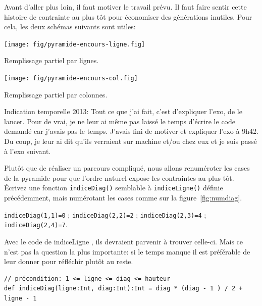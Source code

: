 \documentclass[10pt]{article}\usepackage[nu]{esial}
\begin{document}
\begin{Reponse}
  Avant d'aller plus loin, il faut motiver le travail prévu. Il faut faire
  sentir cette histoire de contrainte au plus tôt pour économiser des
  générations inutiles. Pour cela, les deux schémas suivants sont utiles:
  
  \begin{minipage}{.4\linewidth}
    \centering
    \texttt{[image: fig/pyramide-encours-ligne.fig]}\vspace{-.5\baselineskip}
    
    Remplissage partiel par lignes.
  \end{minipage}\hfill
  \begin{minipage}{.4\linewidth} 
    \centering
    \texttt{[image: fig/pyramide-encours-col.fig]}\vspace{-.5\baselineskip}
    
    Remplissage partiel par colonnes.
  \end{minipage}

  Indication temporelle 2013: Tout ce que j'ai fait, c'est d'expliquer l'exo, de
  le lancer. Pour de vrai, je ne leur ai même pas laissé le temps d'écrire le
  code demandé car j'avais pas le temps. J'avais fini de motiver et expliquer
  l'exo à 9h42. Du coup, je leur ai dit qu'ils verraient sur machine et/ou chez
  eux et je suis passé à l'exo suivant.
\end{Reponse}

\Question %
Plutôt que de réaliser un parcours compliqué, nous allons renuméroter les cases
de la pyramide pour que l'ordre naturel expose les contraintes au plus
tôt. Écrivez une fonction \texttt{indiceDiag()} semblable à
\texttt{indiceLigne()} définie précédemment, mais numérotant les cases comme sur
la figure~\ref{fig:numdiag}.
 
\noindent\texttt{indiceDiag(1,1)=0} ; \hfill\texttt{indiceDiag(2,2)=2} ;
\hfill\texttt{indiceDiag(2,3)=4} ; \hfill\texttt{indiceDiag(2,4)=7}.
\begin{Reponse}
  Avec le code de indiceLigne , ils devraient parvenir à trouver celle-ci. Mais
  ce n'est pas la question la plus importante: si le temps manque il est
  préférable de leur donner pour réfléchir plutôt au reste.
  \begin{Verbatim}
// précondition: 1 <= ligne <= diag <= hauteur 
def indiceDiag(ligne:Int, diag:Int):Int = diag * (diag - 1 ) / 2 + ligne - 1
  \end{Verbatim}
\end{Reponse}
\end{document}
